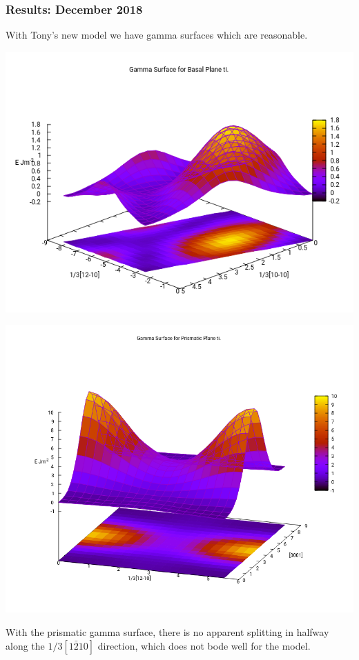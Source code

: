 \documentclass[11pt]{article}
\begin{document}
\subsubsection{Results: December 2018}
\label{sec:orge110736}
With Tony's new model we have gamma surfaces which are reasonable. 
\begin{center}
\includegraphics[width=.9\linewidth]{Images/basal_gamma_surface_2018-12-18.png}
\end{center}
\begin{center}
\includegraphics[width=.9\linewidth]{Images/prismatic_gamma_surface_2018-12-18.png}
\end{center}

With the prismatic gamma surface, there is no apparent splitting in
halfway along the \(1/3[1\bar{2}10]\) direction, which does not bode
well for the model. 
\end{document}
